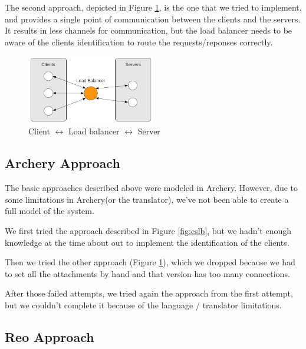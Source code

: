 \documentclass[a4paper]{article}
\newcommand{\ar}{Archery\xspace}
\newcommand{\re}{Reo\xspace}
\begin{document}
The second approach, depicted in Figure \ref{fig:clbs}, is the one that we
tried to implement, and provides a single point of communication between the
clients and the servers. It results in less channels for communication, but the
load balancer needs to be aware of the clients identification to route the
requests/reponses correctly.

\begin{figure}[htb]
	\begin{center}
		\includegraphics[width=0.5\textwidth]{images/c_lb_s.png}
	\end{center}
	\caption{Client $\leftrightarrow$ Load balancer  $\leftrightarrow$ Server }
	\label{fig:clbs}
\end{figure}


\subsection{\ar Approach}

The basic approaches described above were modeled in \ar. However, due to some
limitations in \ar (or the translator), we've not been able to create a full
model of the system.

We first tried the approach described in Figure \ref{fig:cslb}, but we hadn't
enough knowledge at the time about out to implement the identification of the
clients.

Then we tried the other approach (Figure \ref{fig:clbs}), which we dropped because we had to set all
the attachments by hand and that version has too many connections.

After those failed attempts, we tried again the approach from the first
attempt, but we couldn't complete it because of the language / translator
limitations.


\subsection{\re Approach}
\end{document}
